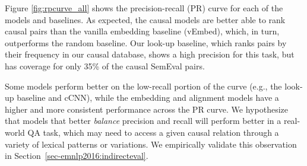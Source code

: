 Figure \ref{fig:rpcurve_all} shows the precision-recall (PR) curve for each of the models and baselines. 
As expected, the causal models are better able to rank causal pairs than the vanilla embedding baseline (vEmbed), which, in turn, outperforms the random baseline.  Our look-up baseline, which ranks pairs by their frequency in our causal database, shows a high precision for this task, but has coverage for only 35\% of the causal SemEval pairs.
%

Some models perform better on the low-recall portion of the curve (e.g., the look-up baseline and cCNN), while the embedding and alignment models have a higher and more consistent performance across the PR curve. We hypothesize that models that better \emph{balance} precision and recall will perform better in a real-world QA task, which may need to access a given causal relation through a variety of lexical patterns or variations. We empirically validate this observation in Section~\ref{sec-emnlp2016:indirecteval}.








